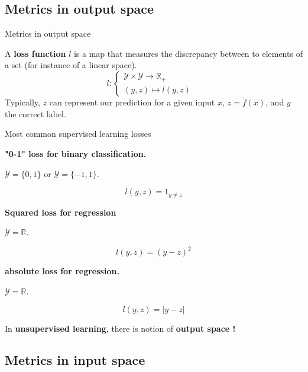 \documentclass[usenames,dvipsnames,french]{beamer}
\begin{document}
\subsection{Metrics in output space}


\begin{frame}{Metrics in output space}

    A \textbf{{loss function}} $l$ is a map that measures the discrepancy between to elements of a set (for instance of a linear space).
$$
l: \left\{
    \begin{array}{ll}
	\mathcal{Y} \times \mathcal{Y} \rightarrow \mathbb{R}_+ & \\
	(y,z) \mapsto l(y,z)& 
    \end{array}
\right.
$$
    Typically, $z$ can represent our prediction for a given input $x$, $z= \tilde{f}(x)$, and $y$ the correct label.

\end{frame}

\begin{frame}{Most common supervised learning losses}

    \textbf{"0-1" loss for \textbf{{binary classification.}}}

     $ \mathcal{Y}  = \{0, 1\}$ or $ \mathcal{Y}  = \{-1, 1\}$.

	\begin{equation}
	    l(y,z) = 1_{y\neq z}
	\end{equation}

	\textbf{Squared loss for \textbf{{regression}}}

$ \mathcal{Y}  = \mathbb{R} $. 

	\begin{equation}
	    l(y,z) = (y-z)^2
	\end{equation}

\textbf{absolute loss for \textbf{{regression}}.}

$ \mathcal{Y}  = \mathbb{R} $. 

	\begin{equation}
	    l(y,z) = |y-z|
	\end{equation}
\end{frame}

\begin{frame}

    In \textbf{unsupervised learning}, there is notion of \textbf{output space !}

\end{frame}

\subsection{Metrics in input space}
\end{document}
